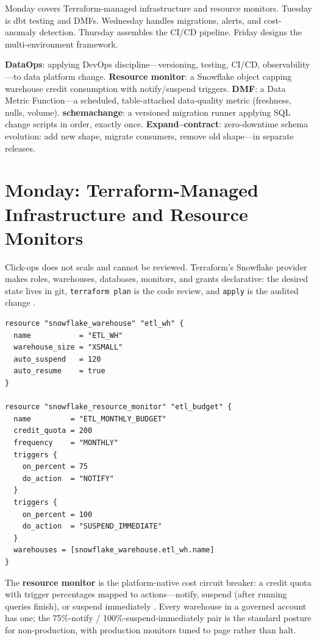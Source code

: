 Monday covers Terraform-managed infrastructure and resource monitors. Tuesday is dbt testing and DMFs. Wednesday handles migrations, alerts, and cost-anomaly detection. Thursday assembles the CI/CD pipeline. Friday designs the multi-environment framework.

\begin{keyterms}
\textbf{DataOps}: applying DevOps discipline---versioning, testing, CI/CD, observability---to data platform change.\quad
\textbf{Resource monitor}: a Snowflake object capping warehouse credit consumption with notify/suspend triggers.\quad
\textbf{DMF}: a Data Metric Function---a scheduled, table-attached data-quality metric (freshness, nulls, volume).\quad
\textbf{schemachange}: a versioned migration runner applying SQL change scripts in order, exactly once.\quad
\textbf{Expand--contract}: zero-downtime schema evolution: add new shape, migrate consumers, remove old shape---in separate releases.
\end{keyterms}

\section{Monday: Terraform-Managed Infrastructure and Resource Monitors}
Click-ops does not scale and cannot be reviewed. Terraform's Snowflake provider makes roles, warehouses, databases, monitors, and grants declarative: the desired state lives in git, \texttt{terraform plan} is the code review, and \texttt{apply} is the audited change \cite{terraformSnowflakeProvider}.

\begin{lstlisting}[caption={Terraform: warehouse plus a resource monitor with two triggers}]
resource "snowflake_warehouse" "etl_wh" {
  name           = "ETL_WH"
  warehouse_size = "XSMALL"
  auto_suspend   = 120
  auto_resume    = true
}

resource "snowflake_resource_monitor" "etl_budget" {
  name         = "ETL_MONTHLY_BUDGET"
  credit_quota = 200
  frequency    = "MONTHLY"
  triggers {
    on_percent = 75
    do_action  = "NOTIFY"
  }
  triggers {
    on_percent = 100
    do_action  = "SUSPEND_IMMEDIATE"
  }
  warehouses = [snowflake_warehouse.etl_wh.name]
}
\end{lstlisting}

The \textbf{resource monitor} is the platform-native cost circuit breaker: a credit quota with trigger percentages mapped to actions---notify, suspend (after running queries finish), or suspend immediately \cite{snowflakeResourceMonitorsDocs}. Every warehouse in a governed account has one; the 75\%-notify / 100\%-suspend-immediately pair is the standard posture for non-production, with production monitors tuned to page rather than halt.

